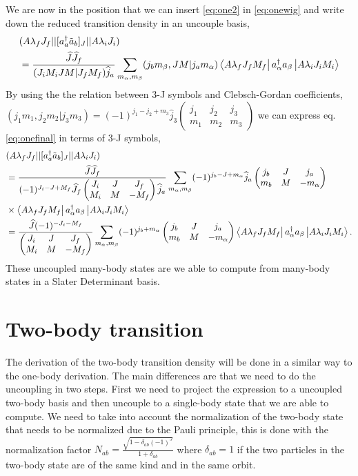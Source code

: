 \documentclass[12pt,a4paper]{article}
\newcommand{\matrixel}[3]{\left\langle #1 \vphantom{#2#3} \right|
 #2 \left| #3 \vphantom{#1#2} \right\rangle} %
\newcommand{\trej}[6]{
\begin{pmatrix}
  #1 & #2 & #3 \\
  #4 & #5 & #6
\end{pmatrix}}
\begin{document}
We are now in the position that we can insert \eqref{eq:one2} in \eqref{eq:onewig} and write down the reduced transition density in an uncouple basis,
\begin{align}
\begin{split}
&(A\lambda_f J_f || [a^{\dagger}_a \tilde{a}_b]_J||A\lambda_i J_i) \\
&=\frac{\widehat{J}\widehat{J}_f}{(J_i M_i J M|J_fM_f)\widehat{j}_a}\sum_{m_{\alpha},m_{\beta}}(j_bm_{\beta},JM|j_a m_{\alpha}) \matrixel{A \lambda_f J_fM_f}{a^{\dagger}_{\alpha}a_{\beta}}{A \lambda_i J_i M_i}
\label{eq:onefinal}
\end{split}
\end{align}
By using the the relation between 3-J symbols and Clebsch-Gordan coefficients,  $(j_1m_1, j_2 m_2|j_3m_3)=(-1)^{j_1-j_2+m_3}\widehat{j}_3\trej{j_1}{j_2}{j_3}{m_1}{m_2}{m_3}$ we can express eq. \ref{eq:onefinal} in terms of 3-J symbols,
\begin{align}
\begin{split}
&(A\lambda_f J_f || [a^{\dagger}_a \tilde{a}_b]_J||A\lambda_i J_i) \\
&=\frac{\widehat{J}\widehat{J}_f}{(-1)^{J_i-J+M_{f}}\widehat{J}_f\trej{J_i}{J}{J_f}{M_i}{M}{-M_f} \widehat{j}_a}\sum_{m_{\alpha},m_{\beta}}(-1)^{j_b-J+m_{\alpha}}\widehat{j}_a\trej{j_b}{J}{j_a}{m_b}{M}{-m_{\alpha}}\\
&\times \matrixel{A \lambda_f J_fM_f}{a^{\dagger}_{\alpha}a_{\beta}}{A \lambda_i J_i M_i}\\
&=\frac{\widehat{J}(-1)^{-J_i-M_{f}}}{\trej{J_i}{J}{J_f}{M_i}{M}{-M_f}}\sum_{m_{\alpha},m_{\beta}}(-1)^{j_b+m_{\alpha}}\trej{j_b}{J}{j_a}{m_b}{M}{-m_{\alpha}} \matrixel{A \lambda_f J_fM_f}{a^{\dagger}_{\alpha}a_{\beta}}{A \lambda_i J_i M_i}.
\label{eq:onefinal-3j}
\end{split}
\end{align}
These uncoupled many-body states are we able to compute from many-body states in a Slater Determinant basis. %


\section{Two-body transition}
The derivation of the two-body transition density will be done in a similar way to the one-body derivation. The main differences are that we need to do the uncoupling in two steps. First we need to project the expression to a uncoupled two-body basis and then uncouple to a single-body state that we are able to compute. We need to take into account the normalization of the two-body state that needs to be normalized due to the Pauli principle, this is done with the normalization factor $N_{ab}=\frac{\sqrt{1-\delta_{ab}(-1)^J}}{1+\delta_{ab}}$ where $\delta_{ab}=1$ if the two particles in the two-body state are of the same kind and in the same orbit.
\end{document}
